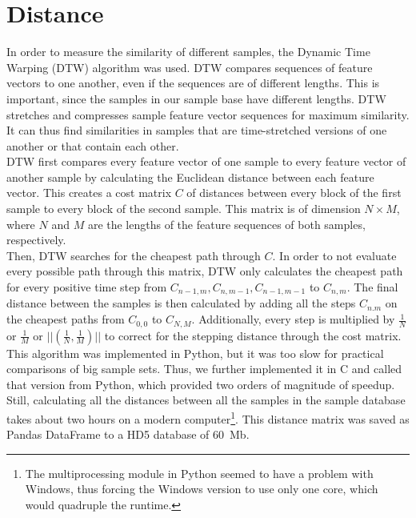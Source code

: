\section{Distance}
\label{sec:Distance}
In order to measure the similarity of different samples, the Dynamic Time Warping (DTW) algorithm was used. DTW compares sequences of feature vectors to one another, even if the sequences are of different lengths. This is important, since the samples in our sample base have different lengths. DTW stretches and compresses sample feature vector sequences for maximum similarity. It can thus find similarities in samples that are time-stretched versions of one another or that contain each other.\\
DTW first compares every feature vector of one sample to every feature vector of another sample by calculating the Euclidean distance between each feature vector. This creates a cost matrix $C$ of distances between every block of the first sample to every block of the second sample. This matrix is of dimension $N \times M$, where $N$ and $M$ are the lengths of the feature sequences of both samples, respectively.\\
Then, DTW searches for the cheapest path through $C$. In order to not evaluate every possible path through this matrix, DTW only calculates the cheapest path for every positive time step from $C_{n-1,m}, C_{n,m-1}, C_{n-1,m-1}$ to $C_{n,m}$. The final distance between the samples is then calculated by adding all the steps $C_{n.m}$ on the cheapest paths from $C_{0,0}$ to $C_{N,M}$. Additionally, every step is multiplied by $\frac{1}{N}$ or $\frac{1}{M}$ or $||(\frac{1}{N},\frac{1}{M})||$ to correct for the stepping distance through the cost matrix.\\
This algorithm was implemented in Python, but it was too slow for practical comparisons of big sample sets. Thus, we further implemented it in C and called that version from Python, which provided two orders of magnitude of speedup. Still, calculating all the distances between all the samples in the sample database takes about two hours on a modern computer\footnote{The multiprocessing module in Python seemed to have a problem with Windows, thus forcing the Windows version to use only one core, which would quadruple the runtime.}. This distance matrix was saved as Pandas DataFrame to a HD5 database of 60~Mb.